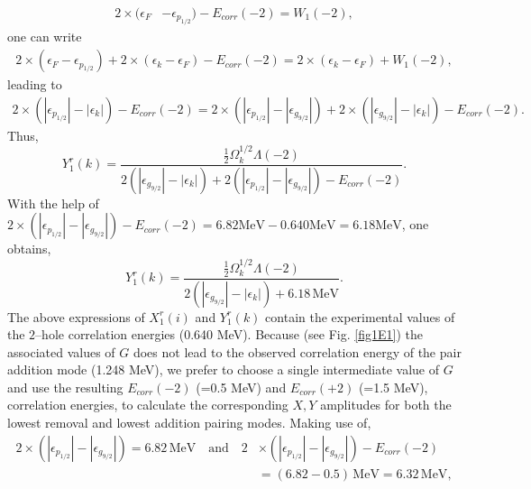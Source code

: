 \begin{equation*}
\begin{split}
2\times(\epsilon_F&-\epsilon_{p_{1/2}})-E_{corr}(-2)=W_1(-2),
\end{split}
\end{equation*}
one can write
\begin{equation*}
\begin{split}
2\times(\epsilon_F-\epsilon_{p_{1/2}})+2\times(\epsilon_k-\epsilon_{F})-E_{corr}(-2)=2\times(\epsilon_k-\epsilon_{F})+W_1(-2),
\end{split}
\end{equation*}
leading to 
\begin{equation*}
\begin{split}
2\times(|\epsilon_{p_{1/2}}|-|\epsilon_k|)-E_{corr}(-2)=2\times(|\epsilon_{p_{1/2}}|-|\epsilon_{g_{9/2}}|)+2\times(|\epsilon_{g_{9/2}}|-|\epsilon_k|)-E_{corr}(-2).
\end{split}
\end{equation*}
Thus, 
\begin{equation*}
Y_1^r(k)=\frac{\frac{1}{2}\Omega_k^{1/2}\Lambda(-2)}{2(|\epsilon_{g_{9/2}}|-|\epsilon_k|)+2(|\epsilon_{p_{1/2}}|-|\epsilon_{g_{9/2}}|)-E_{corr}(-2)}.
\end{equation*}
With the help of  $2\times(|\epsilon_{p_{1/2}}|-|\epsilon_{g_{9/2}}|)-E_{corr}(-2)=6.82 \text{MeV}-0.640 \text{MeV}=6.18 \text{MeV}$, one obtains,
\begin{equation*}
Y_1^r(k)=\frac{\frac{1}{2}\Omega_k^{1/2}\Lambda(-2)}{2(|\epsilon_{g_{9/2}}|-|\epsilon_k|)+6.18\,\text{MeV}}.
\end{equation*}
The above  expressions of $X_1^r(i)$ and $Y_1^r(k)$ contain the experimental values of the $2$--hole correlation energies (0.640 MeV). Because (see Fig. \ref{fig1E1}) the associated values of $G$ does not lead to the observed correlation energy of the pair addition mode (1.248 MeV), we prefer to choose a single intermediate value of $G$ and use the resulting $E_{corr}(-2)$ (=0.5 MeV) and $E_{corr}(+2)$ (=1.5 MeV), correlation energies, to calculate the corresponding $X,Y$ amplitudes for both the lowest removal and lowest addition pairing modes. Making use of, 
\begin{equation*}
\begin{split}
2\times(|\epsilon_{p_{1/2}}|-|\epsilon_{g_{9/2}}|)=6.82\,\text{MeV}\quad\text{and}\quad 2&\times(|\epsilon_{p_{1/2}}|-|\epsilon_{g_{9/2}}|)-E_{corr}(-2)\\
&=(6.82-0.5)\,\text{MeV}=6.32\,\text{MeV},
\end{split}
\end{equation*}
